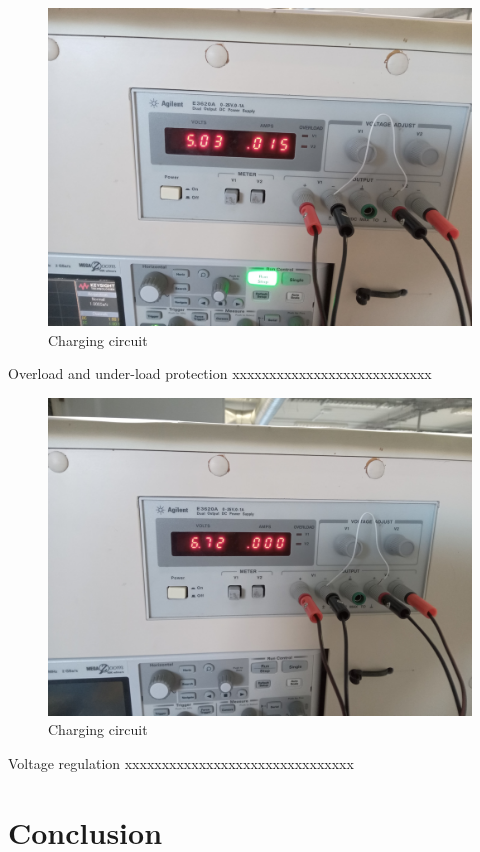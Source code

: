 \documentclass[class=report,11pt,crop=false]{standalone}
\begin{document}
	
	\begin{figure}[h!]
	\centering
	\includegraphics[width=0.8\linewidth]{Figures/Overloading current.jpg}
	\caption{Charging circuit}
	\label{fig: P7}
	\end{figure}
	
	
	Overload and under-load protection xxxxxxxxxxxxxxxxxxxxxxxxxxx
	
	\begin{figure}[h!]
		\centering
		\includegraphics[width=0.8\linewidth]{Figures/OverloadAndUnderloadProtection.jpg}
		\caption{Charging circuit}
		\label{fig: P8}
	\end{figure}
	
	Voltage regulation xxxxxxxxxxxxxxxxxxxxxxxxxxxxxxx
	\section{Conclusion}
	
\end{document}
